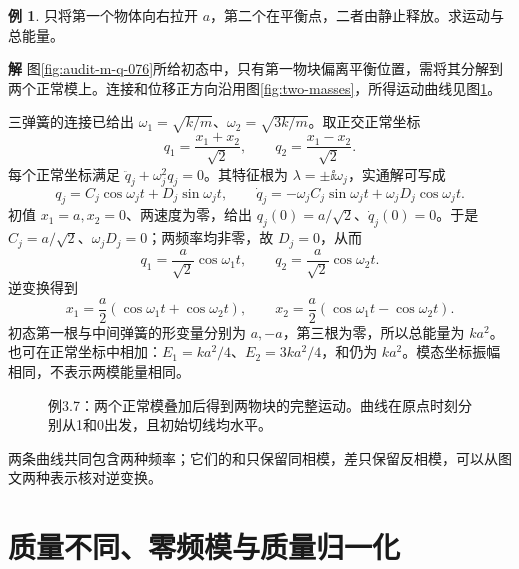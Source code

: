 \documentclass[11pt,openany,fontset=fandol]{ctexbook}
\theoremstyle{plain}\newtheorem{theorem}{定理}[chapter]\newtheorem{proposition}[theorem]{命题}
\theoremstyle{definition}\newtheorem{definition}{定义}[chapter]\newtheorem{example}{例}[chapter]
\theoremstyle{remark}\newtheorem*{remark}{说明}
\newcommand{\SolutionStart}{\par\nobreak\medskip\nobreak\noindent\textbf{解}\quad\ignorespaces}
\newenvironment{solution}{\SolutionStart}{\par\medskip}
\begin{document}
\begin{example}
只将第一个物体向右拉开 $a$，第二个在平衡点，二者由静止释放。求运动与总能量。
\end{example}

\begin{solution}
图\ref{fig:audit-m-q-076}所给初态中，只有第一物块偏离平衡位置，需将其分解到两个正常模上。连接和位移正方向沿用图\ref{fig:two-masses}，所得运动曲线见图\ref{fig:eg-3-7}。

三弹簧的连接已给出 $\omega_1=\sqrt{k/m}$、$\omega_2=\sqrt{3k/m}$。取正交正常坐标
\[
q_1=\frac{x_1+x_2}{\sqrt2},\qquad
q_2=\frac{x_1-x_2}{\sqrt2}.
\]
每个正常坐标满足 $\ddot q_j+\omega_j^2q_j=0$。其特征根为 $\lambda=\pm\ii\omega_j$，实通解可写成
\[
q_j=C_j\cos\omega_jt+D_j\sin\omega_jt,
\qquad
\dot q_j=-\omega_j C_j\sin\omega_jt+\omega_j D_j\cos\omega_jt.
\]
初值 $x_1=a,x_2=0$、两速度为零，给出 $q_j(0)=a/\sqrt2$、$\dot q_j(0)=0$。于是 $C_j=a/\sqrt2$、$\omega_jD_j=0$；两频率均非零，故 $D_j=0$，从而
\[
q_1=\frac a{\sqrt2}\cos\omega_1t,\qquad
q_2=\frac a{\sqrt2}\cos\omega_2t.
\]
逆变换得到
\[
x_1=\frac a2(\cos\omega_1t+\cos\omega_2t),\qquad
x_2=\frac a2(\cos\omega_1t-\cos\omega_2t).
\]
初态第一根与中间弹簧的形变量分别为 $a,-a$，第三根为零，所以总能量为 $ka^2$。也可在正常坐标中相加：$E_1=ka^2/4$、$E_2=3ka^2/4$，和仍为 $ka^2$。模态坐标振幅相同，不表示两模能量相同。

\begin{figure}[H]\centering
{}
\caption{例3.7：两个正常模叠加后得到两物块的完整运动。曲线在原点时刻分别从1和0出发，且初始切线均水平。}\label{fig:eg-3-7}
\end{figure}

两条曲线共同包含两种频率；它们的和只保留同相模，差只保留反相模，可以从图文两种表示核对逆变换。
\end{solution}

\section{质量不同、零频模与质量归一化}
\end{document}
